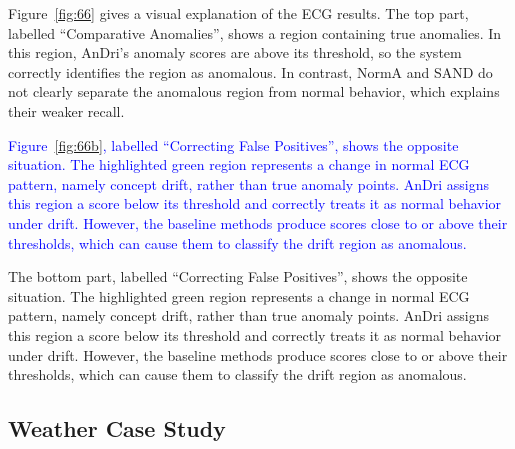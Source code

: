 Figure~\ref{fig:66} gives a visual explanation of the ECG results. The top part, labelled ``Comparative Anomalies'', shows a region containing true anomalies. In this region, AnDri's anomaly scores are above its threshold, so the system correctly identifies the region as anomalous. In contrast, NormA and SAND do not clearly separate the anomalous region from normal behavior, which explains their weaker recall.



\textcolor{blue}{Figure~\ref{fig:66b}, labelled ``Correcting False Positives'', shows the opposite situation. The highlighted green region represents a change in normal ECG pattern, namely concept drift, rather than true anomaly points. AnDri assigns this region a score below its threshold and correctly treats it as normal behavior under drift. However, the baseline methods produce scores close to or above their thresholds, which can cause them to classify the drift region as anomalous.}

The bottom part, labelled ``Correcting False Positives'', shows the opposite situation. The highlighted green region represents a change in normal ECG pattern, namely concept drift, rather than true anomaly points. AnDri assigns this region a score below its threshold and correctly treats it as normal behavior under drift. However, the baseline methods produce scores close to or above their thresholds, which can cause them to classify the drift region as anomalous.

\subsection{Weather Case Study}

